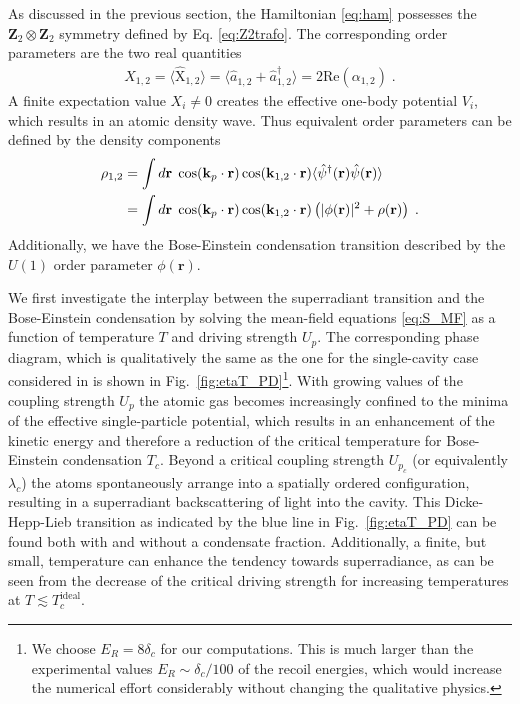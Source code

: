 \documentclass[12pt]{iopart}
\begin{document}
As discussed in the previous section, the Hamiltonian \eqref{eq:ham}
possesses the $\mathbf{Z}_2\otimes\mathbf{Z}_2$ symmetry defined
by Eq. \eqref{eq:Z2trafo}. The corresponding order parameters are the two
real quantities 
\begin{align}
X_{1,2}=\langle \hat{\mathrm{X}}_{1,2}\rangle=\langle \hat{a}_{1,2}^{\phantom{\dag}}+\hat{a}_{1,2}^\dag\rangle=2\mathrm{Re}(\alpha_{1,2})\;.
\end{align}
A finite expectation value $X_i \neq 0$ creates the effective one-body potential $V_i$, which results in an atomic density wave. Thus equivalent order parameters can be defined by the density components
\begin{align}
\rho_{1,2}&=\int d\mathbf{r}\;\cos(\mathbf{k}_p\cdot\mathbf{r})\cos(\mathbf{k}_{1,2}\cdot\mathbf{r}) \langle \hat{\psi}^\dag(\mathbf{r}) \hat{\psi}(\mathbf{r})\rangle\notag\\&=\int d\mathbf{r}\;\cos(\mathbf{k}_p\cdot\mathbf{r})\cos(\mathbf{k}_{1,2}\cdot\mathbf{r}) \left(|\phi(\mathbf{r})|^2+\rho(\mathbf{r})\right)\;.
\end{align}
Additionally, we have the Bose-Einstein condensation transition
described by the $U(1)$ order parameter $\phi(\mathbf{r})$.

We first investigate the interplay
between the superradiant transition and the Bose-Einstein condensation
by solving the mean-field equations \eqref{eq:S_MF} as a function of
temperature $T$ and driving strength $U_p$. The corresponding phase diagram, which is qualitatively the same as the one for the single-cavity case considered in \cite{piazza_bose} is
shown in Fig.~\ref{fig:etaT_PD}\footnote{We choose $E_R=8\delta_c$ for our computations. This is much larger than the 
experimental values $E_R\sim\delta_c/100$ of the recoil energies, which would increase the numerical effort 
considerably without changing the qualitative physics.}. With growing values of the coupling strength $U_p$ the atomic gas becomes increasingly confined to the minima of the effective single-particle potential, which results in an enhancement of the kinetic energy and therefore a reduction of the critical temperature for Bose-Einstein condensation $T_c$. Beyond a critical coupling strength $U_{p_c}$ (or equivalently $\lambda_c$) the atoms spontaneously arrange into a spatially ordered configuration, resulting in a superradiant backscattering of light into the cavity. This Dicke-Hepp-Lieb transition as indicated by the blue line in Fig.~\ref{fig:etaT_PD} can be found both with and without a condensate
fraction. Additionally, a finite, but small, temperature can enhance the tendency
towards superradiance, as can be seen from the decrease of the
critical driving strength for increasing temperatures at $T\lesssim T_c^\text{ideal}$.
\end{document}
